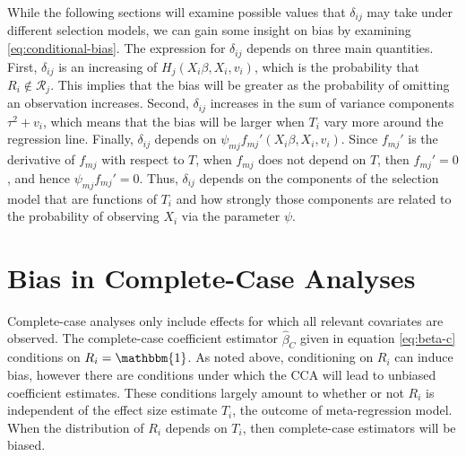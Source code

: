 \documentclass[
]{article}
\begin{document}
While the following sections will examine possible values that \(\delta_{ij}\) may take under different selection models, we can gain some insight on bias by examining \eqref{eq:conditional-bias}.
The expression for \(\delta_{ij}\) depends on three main quantities.
First, \(\delta_{ij}\) is an increasing of \(H_j(X_i\beta, X_i, v_i)\), which is the probability that \(R_i \not\in \mathcal{R}_j\).
This implies that the bias will be greater as the probability of omitting an observation increases.
Second, \(\delta_{ij}\) increases in the sum of variance components \(\tau^2 + v_i\), which means that the bias will be larger when \(T_i\) vary more around the regression line.
Finally, \(\delta_{ij}\) depends on \(\psi_{mj} f_{mj}'(X_i\beta, X_i, v_i)\).
Since \(f_{mj}'\) is the derivative of \(f_{mj}\) with respect to \(T\), when \(f_{mj}\) does not depend on \(T\), then \(f_{mj}' = 0\), and hence \(\psi_{mj} f_{mj}' = 0\).
Thus, \(\delta_{ij}\) depends on the components of the selection model that are functions of \(T_i\) and how strongly those components are related to the probability of observing \(X_i\) via the parameter \(\psi\).

\hypertarget{bias-in-complete-case-analyses}{%
\section{Bias in Complete-Case Analyses}\label{bias-in-complete-case-analyses}}

Complete-case analyses only include effects for which all relevant covariates are observed.
The complete-case coefficient estimator \(\hat{\beta}_C\) given in equation \eqref{eq:beta-c} conditions on \(R_i = \mathbbm{1}\).
As noted above, conditioning on \(R_i\) can induce bias, however there are conditions under which the CCA will lead to unbiased coefficient estimates.
These conditions largely amount to whether or not \(R_i\) is independent of the effect size estimate \(T_i\), the outcome of meta-regression model.
When the distribution of \(R_i\) depends on \(T_i\), then complete-case estimators will be biased.
\end{document}
